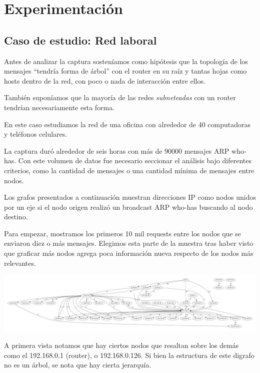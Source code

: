 \section{Experimentación}

\subsection{Caso de estudio: Red laboral}

Antes de analizar la captura sosteníamos como hipótesis que la topología de los mensajes ``tendría forma de árbol'' con el router en su raíz y tantas hojas como hosts dentro de la red, con poco o nada de interacción entre ellos.\newline

También suponíamos que la mayoría de las redes \textit{subneteadas} con un router tendrían necesariamente esta forma.\newline

En este caso estudiamos la red de una oficina con alrededor de 40 computadoras y teléfonos celulares.\newline

La captura duró alrededor de seis horas con más de 90000 mensajes ARP who-has. Con este volumen de datos fue necesario seccionar el análisis bajo diferentes criterios, como la cantidad de mensajes o una cantidad mínima de mensajes entre nodos.\newline

Los grafos presentados a continuación muestran direcciones IP como nodos unidos por un eje si el nodo origen realizó un broadcast ARP who-has buscando al nodo destino.\newline

Para empezar, mostramos los primeros 10 mil requests entre los nodos que se enviaron diez o más mensajes. Elegimos esta parte de la muestra tras haber visto que graficar más nodos agrega poca información nueva respecto de los nodos más relevantes.\newline

\includegraphics[scale=0.25,angle=90]{graphics/t-work-10000c-10w.png}

A primera vista notamos que hay ciertos nodos que resaltan sobre los demás como el 192.168.0.1 (router), o 192.168.0.126. Si bien la estructura de este digrafo no es un árbol, se nota que hay cierta jerarquía.\newline

